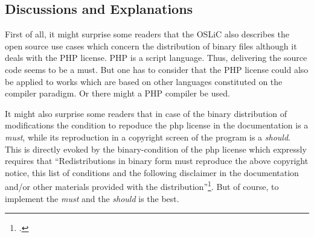 \subsection{Discussions and Explanations}

\label{sec:PhpDiscussions}

First of all, it might surprise some readers that the OSLiC also describes the
open source use cases which concern the distribution of binary files although it
deals with the PHP license. PHP is a script language. Thus, delivering the
source code seems to be a must. But one has to consider that the PHP license
could also be applied to works which are based on other languages constituted on
the compiler paradigm. Or there might a PHP compiler be used.

It might also surprise some readers that in case of the binary distribution of
modifications the condition to repoduce the php license in the documentation is
a \emph{must}, while its reproduction in a copyright screen of the program is a
\emph{should}. This is directly evoked by the binary-condition of the php license
which expressly requires that \enquote{Redistributions in binary form must
reproduce the above copyright notice, this list of conditions and the following
disclaimer in the documentation and/or other materials provided with the
distribution}\footcite[cf.][wp. §2]{Php30OsiLicense2013a}. But of course, to
implement the \emph{must} and the \emph{should} is the best.

%

